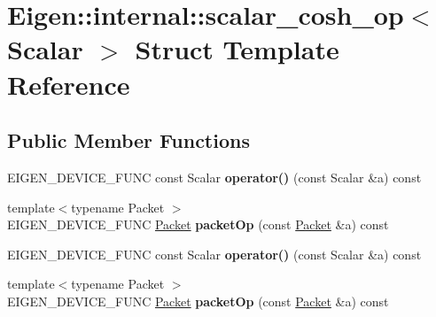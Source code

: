 \hypertarget{struct_eigen_1_1internal_1_1scalar__cosh__op}{}\section{Eigen\+:\+:internal\+:\+:scalar\+\_\+cosh\+\_\+op$<$ Scalar $>$ Struct Template Reference}
\label{struct_eigen_1_1internal_1_1scalar__cosh__op}
\subsection*{Public Member Functions}
\begin{DoxyCompactItemize}
\item 
\mbox{\label{struct_eigen_1_1internal_1_1scalar__cosh__op_a94666c8e625e321cfab01e90ba8df8ad}} 
E\+I\+G\+E\+N\+\_\+\+D\+E\+V\+I\+C\+E\+\_\+\+F\+U\+NC const Scalar {\bfseries operator()} (const Scalar \&a) const
\item 
\mbox{\label{struct_eigen_1_1internal_1_1scalar__cosh__op_ab85234ac5207d6a51dc5512a217e9a92}} 
{\footnotesize template$<$typename Packet $>$ }\\E\+I\+G\+E\+N\+\_\+\+D\+E\+V\+I\+C\+E\+\_\+\+F\+U\+NC \hyperlink{union_eigen_1_1internal_1_1_packet}{Packet} {\bfseries packet\+Op} (const \hyperlink{union_eigen_1_1internal_1_1_packet}{Packet} \&a) const
\item 
\mbox{\label{struct_eigen_1_1internal_1_1scalar__cosh__op_a94666c8e625e321cfab01e90ba8df8ad}} 
E\+I\+G\+E\+N\+\_\+\+D\+E\+V\+I\+C\+E\+\_\+\+F\+U\+NC const Scalar {\bfseries operator()} (const Scalar \&a) const
\item 
\mbox{\label{struct_eigen_1_1internal_1_1scalar__cosh__op_ab85234ac5207d6a51dc5512a217e9a92}} 
{\footnotesize template$<$typename Packet $>$ }\\E\+I\+G\+E\+N\+\_\+\+D\+E\+V\+I\+C\+E\+\_\+\+F\+U\+NC \hyperlink{union_eigen_1_1internal_1_1_packet}{Packet} {\bfseries packet\+Op} (const \hyperlink{union_eigen_1_1internal_1_1_packet}{Packet} \&a) const
\end{DoxyCompactItemize}



